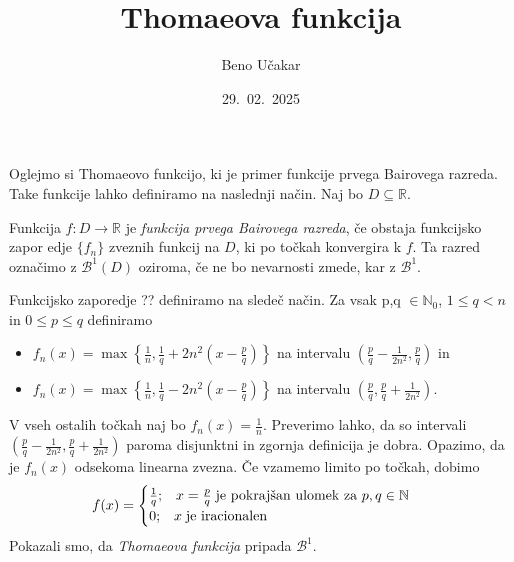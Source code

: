 \documentclass[12pt]{article}
\def\B{\mathscr{B}^{1}}
\begin{document}
\title{Thomaeova funkcija}
\author{Beno Učakar}
\date{29.~02.~2025}

Oglejmo si Thomaeovo funkcijo, ki je primer funkcije prvega Bairovega razreda.
Take funkcije lahko definiramo na naslednji način.
Naj bo \(D\subseteq \mathbb{R}\).

Funkcija \(f:D \to \mathbb{R} \) je \emph{funkcija prvega Bairovega razreda}, 
če obstaja funkcijsko zapor
edje $\{f_n\}$ zveznih funkcij na $D$, ki po točkah konvergira k $f$. 
Ta razred označimo z \(\B(D)\) oziroma, če ne bo nevarnosti zmede, kar z \(\B\).

\begin{zgled}
Funkcijsko zaporedje ?? definiramo na sledeč način.
Za vsak p,q \(\in \mathbb{N}_0\), $1 \le q < n$ in $0 \le p \le q$ definiramo
\begin{itemize}
    \item \(f_n(x) = \max\left\{\frac{1}{n}, \frac{1}{q} + 2n^2\left(x - \frac{p}{q}\right)\right\}\) na intervalu \(\left(\frac{p}{q} - \frac{1}{2n^2}, \frac{p}{q}\right)\) in
    \item \(f_n(x) = \max\left\{\frac{1}{n}, \frac{1}{q} - 2n^2\left(x - \frac{p}{q}\right)\right\}\) na intervalu \(\left(\frac{p}{q}, \frac{p}{q} + \frac{1}{2n^2}\right)\).
\end{itemize}
V vseh ostalih točkah naj bo $f_n(x) = \frac{1}{n}$.
Preverimo lahko, da so intervali $\left(\frac{p}{q} - \frac{1}{2n^2}, \frac{p}{q} + \frac{1}{2n^2}\right)$ paroma disjunktni in zgornja definicija je dobra.
Opazimo, da je $f_n(x)$ odsekoma linearna zvezna. Če vzamemo limito po točkah, dobimo
\[
f(x) =
\begin{cases}
    \frac{1}{q}; \;\;\; x=\frac{p}{q} \; \text{je pokrajšan ulomek za \(p,\- q \in \mathbb{N} \) }
    \\
    0; \;\;\; x \; \text{je iracionalen}
\end{cases} 
\]
Pokazali smo, da \emph{Thomaeova funkcija} pripada \(\B\).
\end{zgled}



\nocite{*}
\end{document}
